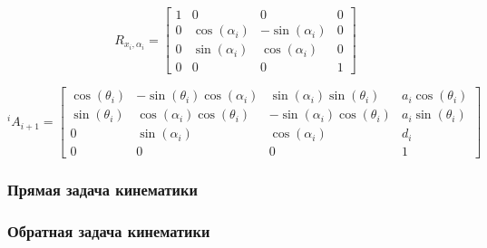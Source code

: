 \begin{equation}\label{DH_matrix_Rx}
R_{x_i, \alpha_i} =
\left[\begin{matrix}
1 & 0 & 0 & 0\\
0 & \cos{\left (\alpha_i \right )} & - \sin{\left (\alpha_i \right )} & 0\\
0 & \sin{\left (\alpha_i \right )} & \cos{\left (\alpha_i \right )} & 0\\
0 & 0 & 0 & 1
\end{matrix}\right]
\end{equation}

\begin{equation}\label{DH_matrix_Ai}
^{i}A_{i+1} =
\left[\begin{matrix}
\cos{\left (\theta_i \right )} & - \sin{\left (\theta_i \right )} \cos{\left (\alpha_i \right )} & \sin{\left (\alpha_i \right )} \sin{\left (\theta_i \right )} & a_{i} \cos{\left (\theta_i \right )}\\
\sin{\left (\theta_i \right )} & \cos{\left (\alpha_i \right )} \cos{\left (\theta_i \right )} & - \sin{\left (\alpha_i \right )} \cos{\left (\theta_i \right )} & a_{i} \sin{\left (\theta_i \right )}\\
0 & \sin{\left (\alpha_i \right )} & \cos{\left (\alpha_i \right )} & d_{i}\\
0 & 0 & 0 & 1
\end{matrix}\right]
\end{equation}

\subsubsection{Прямая задача кинематики}\label{part_kinematics_forward}



\subsubsection{Обратная задача кинематики}\label{part_kinematics_inverse}

\newpage